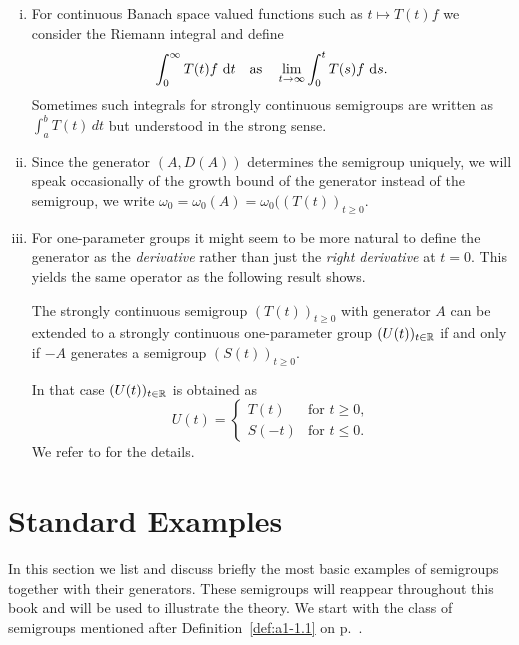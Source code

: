 \begin{remarks}\label{rem:a1-1.12}
\begin{enumerate}[(i), wide, labelsep=1em, itemindent=\parindent]

\item 
For continuous Banach space valued functions such as $t \mapsto T(t)f$ we consider the Riemann integral and define 
\[
\int_{0}^{\infty}T(t)f \, \mathop{}\!\mathrm{d}{t} 
\quad \text{as} \quad
\lim_{t \to \infty}\int_{0}^{t}T(s)f \, \mathop{}\!\mathrm{d}{s} .
\]
Sometimes such integrals for strongly continuous semigroups are written as $\int_{a}^{b}T(t) \, dt$ but understood in the strong sense.

\item 
Since the generator $(A,D(A))$ determines the semigroup uniquely, we will speak occasionally of the growth bound of the generator instead of the semigroup, \ie we write $\omega_{0} = \omega_{0}(A) = \omega_{0}((T(t))_{t \geq 0}$.

\item 
For one-parameter groups it might seem to be more natural to define the generator as the \emph{derivative} rather than just the \emph{right derivative} at $t = 0$.
This yields the same operator as the following result shows.

The strongly continuous semigroup $(T(t))_{t \geq 0}$ with generator $A$ can be extended to a strongly continuous one-parameter group $(U(t))_{t \in \mathbb{R}}$ if and only if $-A$ generates a semigroup $(S(t))_{t \geq 0}$.

In that case $(U(t))_{t \in \mathbb{R}}$ is obtained as
\[
    U(t) = \begin{cases}
        T(t) & \text{for } t \geq 0 ,\\
        S(-t) & \text{for } t \leq 0 .
    \end{cases}
\]
We refer to \citet[Prop.1.14]{davies:1980} for the details.

\end{enumerate}
\end{remarks}
\section{Standard Examples}\label{sec:a1-2}
In this section we list and discuss briefly the most basic examples of semigroups together with their generators.
These semigroups will reappear throughout this book and will be used to illustrate the theory.
We start with the class of semigroups mentioned after Definition~\ref{def:a1-1.1} on p.~\pageref{def:a1-1.1}.
